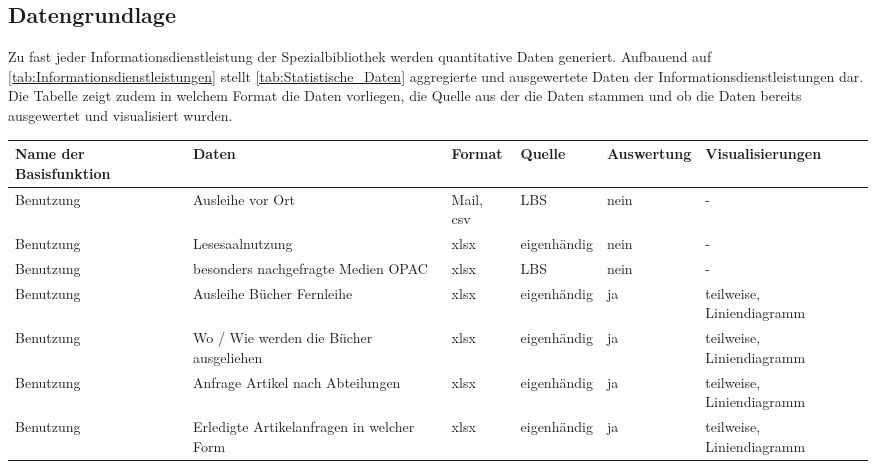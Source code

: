 \subsection{Datengrundlage}

Zu fast jeder Informationsdienstleistung der Spezialbibliothek werden quantitative Daten generiert. 
Aufbauend auf \autoref{tab:Informationsdienstleistungen} stellt \autoref{tab:Statistische_Daten} aggregierte und
ausgewertete Daten der Informationsdienstleistungen dar. Die Tabelle zeigt zudem in welchem Format die Daten vorliegen, 
die Quelle aus der die Daten stammen und ob die Daten bereits ausgewertet und visualisiert wurden.
\begingroup
\setlength{\tabcolsep}{4pt} %
\renewcommand{\arraystretch}{1.5}
\begin{table}[h]
    \centering
    \large
    \begin{adjustbox}{max width=\textwidth}
    \begin{tabular}{llllll}
       \toprule
       \textbf{Name der Basisfunktion}      & \textbf{Daten}                    & \textbf{Format}       & \textbf{Quelle}    &\textbf{Auswertung} & \textbf{Visualisierungen}\\
       \midrule     
            Benutzung                       & Ausleihe vor Ort                          & Mail, csv      & LBS                       & nein  & -\\ 
            Benutzung                       & Lesesaalnutzung                           & xlsx          & eigenhändig               & nein  & -\\ 
            Benutzung                       & besonders nachgefragte Medien OPAC        & xlsx          & LBS                       & nein  & -\\ 
            Benutzung                       & Ausleihe Bücher Fernleihe                 & xlsx          & eigenhändig               & ja    & teilweise, Liniendiagramm\\ 
            Benutzung                       & Wo / Wie werden die Bücher ausgeliehen    & xlsx          & eigenhändig               & ja    & teilweise, Liniendiagramm\\
            Benutzung                       & Anfrage Artikel nach Abteilungen          & xlsx          & eigenhändig               & ja    & teilweise, Liniendiagramm\\
            Benutzung                       & Erledigte Artikelanfragen in welcher Form & xlsx          & eigenhändig               & ja    & teilweise, Liniendiagramm\\ 

\end{tabular}
\end{adjustbox}
\end{table}
